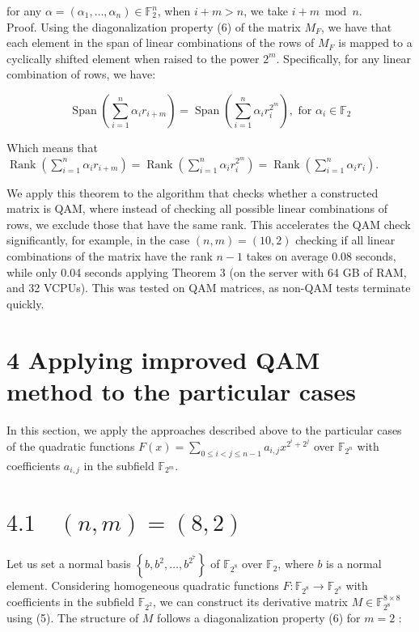 \documentclass[10pt]{article}
\begin{document}
for any $\alpha=\left(\alpha_{1}, \ldots, \alpha_{n}\right) \in \mathbb{F}_{2}^{n}$, when $i+m>n$, we take $i+m \bmod n$.\\
Proof. Using the diagonalization property (6) of the matrix $M_{F}$, we have that each element in the span of linear combinations of the rows of $M_{F}$ is mapped to a cyclically shifted element when raised to the power $2^{m}$. Specifically, for any linear combination of rows, we have:

$$
\operatorname{Span}\left(\sum_{i=1}^{n} \alpha_{i} r_{i+m}\right)=\operatorname{Span}\left(\sum_{i=1}^{n} \alpha_{i} r_{i}^{2^{m}}\right), \text { for } \alpha_{i} \in \mathbb{F}_{2}
$$

Which means that $\operatorname{Rank}\left(\sum_{i=1}^{n} \alpha_{i} r_{i+m}\right)=\operatorname{Rank}\left(\sum_{i=1}^{n} \alpha_{i} r_{i}^{2^{m}}\right)=\operatorname{Rank}\left(\sum_{i=1}^{n} \alpha_{i} r_{i}\right)$.

We apply this theorem to the algorithm that checks whether a constructed matrix is QAM, where instead of checking all possible linear combinations of rows, we exclude those that have the same rank. This accelerates the QAM check significantly, for example, in the case $(n, m)=(10,2)$ checking if all linear combinations of the matrix have the rank $n-1$ takes on average 0.08 seconds, while only 0.04 seconds applying Theorem 3 (on the server with 64 GB of RAM, and 32 VCPUs). This was tested on QAM matrices, as non-QAM tests terminate quickly.

\section*{4 Applying improved QAM method to the particular cases}
In this section, we apply the approaches described above to the particular cases of the quadratic functions $F(x)=\sum_{0 \leq i<j \leq n-1} a_{i, j} x^{2^{i}+2^{j}}$ over $\mathbb{F}_{2^{n}}$ with coefficients $a_{i, j}$ in the subfield $\mathbb{F}_{2^{m}}$.

\section*{$4.1 \quad(n, m)=(8,2)$}
Let us set a normal basis $\left\{b, b^{2}, \ldots, b^{2^{7}}\right\}$ of $\mathbb{F}_{2^{8}}$ over $\mathbb{F}_{2}$, where $b$ is a normal element. Considering homogeneous quadratic functions $F: \mathbb{F}_{2^{8}} \rightarrow \mathbb{F}_{2^{8}}$ with coefficients in the subfield $\mathbb{F}_{2^{2}}$, we can construct its derivative matrix $M \in \mathbb{F}_{2^{8}}^{8 \times 8}$ using (5). The structure of $M$ follows a diagonalization property (6) for $m=2$ :
\end{document}
